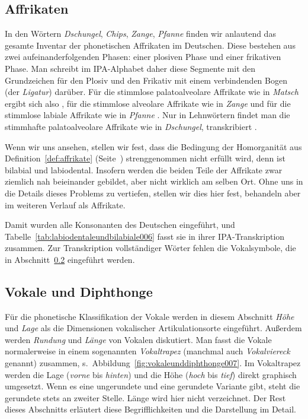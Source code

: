 \subsection{Affrikaten}
\label{sec:affrikaten}


In den Wörtern \textit{Dschungel}, \textit{Chips}, \textit{Zange}, \textit{Pfanne} finden wir anlautend das gesamte Inventar der phonetischen Affrikaten im Deutschen.
Diese bestehen aus zwei aufeinanderfolgenden Phasen: einer plosiven Phase und einer frikativen Phase.
Man schreibt im IPA-Alphabet daher diese Segmente mit den Grundzeichen für den Plosiv und den Frikativ mit einem verbindenden Bogen (der \textit{Ligatur}) darüber.
Für die stimmlose palatoalveolare Affrikate wie in \textit{Matsch} ergibt sich also \textipa{[\t{tS}]}, für die stimmlose alveolare Affrikate wie in \textit{Zange} \textipa{[\t{ts}]} und für die stimmlose labiale Affrikate wie in \textit{Pfanne} \textipa{[\t{pf}]}.
Nur in Lehnwörtern findet man die stimmhafte palatoalveolare Affrikate wie in \textit{Dschungel}, transkribiert \textipa{[\t{dZ}]}.

Wenn wir uns \textipa{[\t{pf}]} ansehen, stellen wir fest, dass die Bedingung der Homorganität aus Definition~\ref{def:affrikate} (Seite~\pageref{def:affrikate}) strenggenommen nicht erfüllt wird, denn \textipa{[p]} ist bilabial und \textipa{[f]} labiodental.
Insofern werden die beiden Teile der Affrikate zwar ziemlich nah beieinander gebildet, aber nicht wirklich am selben Ort.
Ohne uns in die Details dieses Problems zu vertiefen, stellen wir dies hier fest, behandeln \textipa{[\t{pf}]} aber im weiteren Verlauf als Affrikate.

Damit wurden alle Konsonanten des Deutschen eingeführt, und Tabelle~\ref{tab:labiodentaleundbilabiale006} fasst sie in ihrer IPA-Transkription zusammen.
Zur Transkription vollständiger Wörter fehlen die Vokalsymbole, die in Abschnitt~\ref{sec:vokaleunddiphthonge} eingeführt werden.

\subsection{Vokale und Diphthonge}
\label{sec:vokaleunddiphthonge}

Für die phonetische Klassifikation der Vokale werden in diesem Abschnitt \textit{Höhe} und \textit{Lage} als die Dimensionen vokalischer Artikulationsorte eingeführt.
Außerdem werden \textit{Rundung} und \textit{Länge} von Vokalen diskutiert.
Man fasst die Vokale normalerweise in einem sogenannten \textit{Vokaltrapez} (manchmal auch \textit{Vokalviereck} genannt) zusammen, s.\ Abbildung~\ref{fig:vokaleunddiphthonge007}.
Im Vokaltrapez werden die Lage (\textit{vorne} bis \textit{hinten}) und die Höhe (\textit{hoch} bis \textit{tief}) direkt graphisch umgesetzt.
Wenn es eine ungerundete und eine gerundete Variante gibt, steht die gerundete stets an zweiter Stelle.
Länge wird hier nicht verzeichnet.
Der Rest dieses Abschnitts erläutert diese Begrifflichkeiten und die Darstellung im Detail.

